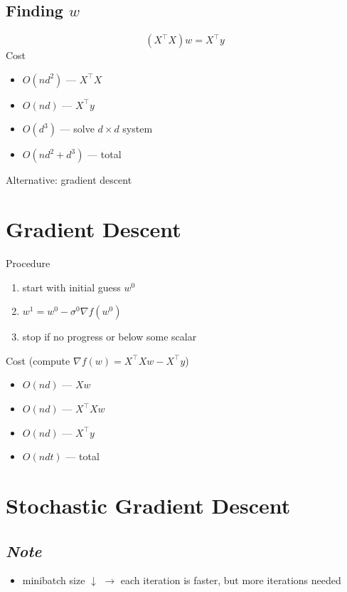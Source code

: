 \documentclass[10pt,landscape,a4paper]{article}
\begin{document}
\begin{multicols*}{5}
\subsection{Finding \(w\)}
\begin{dmath*}
    (X^\intercal X) w = X^\intercal y
\end{dmath*}
Cost
\begin{itemize}
    \item \(O(nd^2)\) --- \(X^\intercal X\)
    \item \(O(nd)\) --- \(X^\intercal y\)
    \item \(O(d^3)\) --- solve \(d \times d\) system
    \item \(O(nd^2 + d^3)\) --- total
\end{itemize}
Alternative: gradient descent


\section{Gradient Descent}
Procedure
\begin{enumerate}
    \item start with initial guess \(w^0\)
    \item \(w^1 = w^0 - \sigma^0 \nabla f(w^0)\)
    \item stop if no progress or below some scalar
\end{enumerate}
Cost (compute \(\nabla f(w) = X^\intercal Xw - X^\intercal y\))
\begin{itemize}
    \item \(O(nd)\) --- \(Xw\)
    \item \(O(nd)\) --- \(X^\intercal Xw\)
    \item \(O(nd)\) --- \(X^\intercal y\)
    \item \(O(ndt)\) --- total
\end{itemize}

\section{Stochastic Gradient Descent}

\subsection{\emph{Note}}
\begin{itemize}
    \item minibatch size \(\downarrow \) \(\rightarrow \) each iteration is faster, but more iterations needed
\end{itemize}


\end{multicols*}
\end{document}
